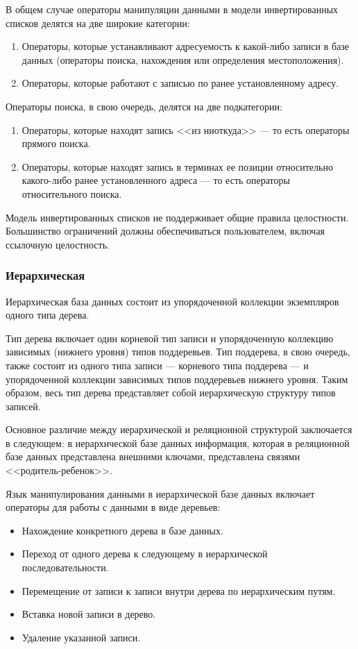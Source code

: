 В общем случае операторы манипуляции данными в модели инвертированных списков делятся на две широкие категории:
\begin{enumerate}
    \item Операторы, которые устанавливают адресуемость к какой-либо записи в базе данных (операторы поиска, нахождения или определения местоположения).
    \item Операторы, которые работают с записью по ранее установленному адресу.
\end{enumerate}

Операторы поиска, в свою очередь, делятся на две подкатегории:
\begin{enumerate}[label=\asbuk*)]
    \item Операторы, которые находят запись <<из ниоткуда>> --- то есть операторы прямого поиска.
    \item Операторы, которые находят запись в терминах ее позиции относительно какого-либо ранее установленного адреса --- то есть операторы относительного поиска.~\cite[с. 389]{date-wr}
\end{enumerate}

Модель инвертированных списков не поддерживает общие правила целостности.
Большинство ограничений должны обеспечиваться пользователем, включая ссылочную целостность.~\cite[с. 391]{date-wr}

\subsubsection{Иерархическая}

Иерархическая база данных состоит из упорядоченной коллекции экземпляров одного типа дерева.

Тип дерева включает один корневой тип записи и упорядоченную коллекцию зависимых (нижнего уровня) типов поддеревьев.
Тип поддерева, в свою очередь, также состоит из одного типа записи --- корневого типа поддерева --- и упорядоченной коллекции зависимых типов поддеревьев нижнего уровня.
Таким образом, весь тип дерева представляет собой иерархическую структуру типов записей.~\cite[с. 406]{date-wr}

Основное различие между иерархической и реляционной структурой заключается в следующем: в иерархической базе данных информация, которая в реляционной базе данных представлена внешними ключами, представлена связями <<родитель-ребенок>>.~\cite[с. 408]{date-wr}

Язык манипулирования данными в иерархической базе данных включает операторы для работы с данными в виде деревьев:
\begin{itemize}
    \item Нахождение конкретного дерева в базе данных.
    \item Переход от одного дерева к следующему в иерархической последовательности.
    \item Перемещение от записи к записи внутри дерева по иерархическим путям.
    \item Вставка новой записи в дерево.
    \item Удаление указанной записи.
\end{itemize}

